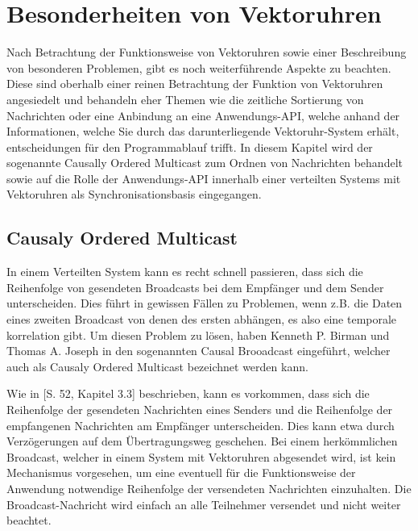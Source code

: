 \section{Besonderheiten von Vektoruhren}

Nach Betrachtung der Funktionsweise von Vektoruhren sowie einer Beschreibung von besonderen Problemen, gibt es noch weiterführende Aspekte zu beachten. Diese sind oberhalb einer reinen Betrachtung der Funktion von Vektoruhren angesiedelt und behandeln eher Themen wie die zeitliche Sortierung von Nachrichten oder eine Anbindung an eine Anwendungs-API, welche anhand der Informationen, welche Sie durch das darunterliegende Vektoruhr-System erhält, entscheidungen für den Programmablauf trifft. In diesem Kapitel wird der sogenannte Causally Ordered Multicast zum Ordnen von Nachrichten behandelt sowie auf die Rolle der Anwendungs-API innerhalb einer verteilten Systems mit Vektoruhren als Synchronisationsbasis eingegangen.
\subsection{Causaly Ordered Multicast}

In einem Verteilten System kann es recht schnell passieren, dass sich die Reihenfolge von gesendeten Broadcasts bei dem Empfänger und dem Sender unterscheiden. Dies führt in gewissen Fällen zu Problemen, wenn z.B. die Daten eines zweiten Broadcast von denen des ersten abhängen, es also eine temporale korrelation gibt. Um diesen Problem zu lösen, haben Kenneth P. Birman und Thomas A. Joseph in \cite{Birman:1987:RCP:7351.7478} den sogenannten Causal Brooadcast eingeführt, welcher auch als Causaly Ordered Multicast bezeichnet werden kann.

Wie in \cite{Birman:1987:RCP:7351.7478}[S. 52, Kapitel 3.3] beschrieben, kann es vorkommen, dass sich die Reihenfolge der gesendeten Nachrichten eines Senders und die Reihenfolge der empfangenen Nachrichten am Empfänger unterscheiden. Dies kann etwa durch Verzögerungen auf dem Übertragungsweg geschehen. Bei einem herkömmlichen Broadcast, welcher in einem System mit Vektoruhren abgesendet wird, ist kein Mechanismus vorgesehen, um eine eventuell für die Funktionsweise der Anwendung notwendige Reihenfolge der versendeten Nachrichten einzuhalten. Die Broadcast-Nachricht wird einfach an alle Teilnehmer versendet und nicht weiter beachtet.

